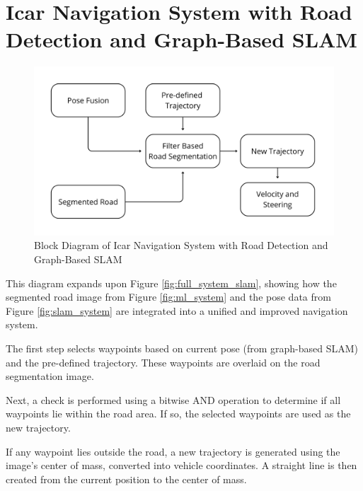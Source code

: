 \section{Icar Navigation System with Road Detection and Graph-Based SLAM} 
\begin{figure}[H]
	\centering
	\includegraphics[width=\linewidth]{../konten/nav_new_sys3.png}
	\caption{Block Diagram of Icar Navigation System with Road Detection and Graph-Based SLAM}
	\label{fig:nav_new_system}
\end{figure} 

This diagram expands upon Figure \ref{fig:full_system_slam}, showing how the segmented road image from Figure \ref{fig:ml_system} and the pose data from Figure \ref{fig:slam_system} are integrated into a unified and improved navigation system.

\par  
The first step selects waypoints based on current pose (from graph-based SLAM) and the pre-defined trajectory. These waypoints are overlaid on the road segmentation image.

\par   
Next, a check is performed using a bitwise AND operation to determine if all waypoints lie within the road area. If so, the selected waypoints are used as the new trajectory.

\par  
If any waypoint lies outside the road, a new trajectory is generated using the image’s center of mass, converted into vehicle coordinates. A straight line is then created from the current position to the center of mass.

